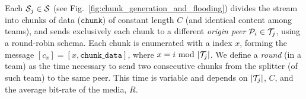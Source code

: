 \begin{figure*}
  \caption{Chunk generation and
    flooding.\label{fig:chunk_generation_and_flooding}}
\end{figure*}
Each ${\cal S}_j\in{\cal S}$ (see
Fig.~\ref{fig:chunk_generation_and_flooding}) divides the stream into
chunks of data ($\mathtt{chunk}$) of constant length $C$ (and
identical content among teams), and sends exclusively each chunk to a
different \emph{origin peer} ${\cal P}_i\in{\cal T}_j$, using a
round-robin schema. Each chunk is enumerated with a index $x$, forming
the message $[c_x]=[x,\mathtt{chunk\_data}]$, where
$x=i~\mathrm{mod}~|{\cal T}_j|$. We define a \emph{round} (in a team)
as the time necessary to send two consecutive chunks from the splitter
(of such team) to the same peer. This time is variable and depends on
$|{\cal T}_j|$, $C$, and the average bit-rate of the media, $R$.

\begin{comment}
The round-time is defined by:
\begin{equation}
  \cal{r} = \cal{c}N.
  \label{eq:round_time}
\end{equation}
For example, if we use only one team of $N=256$ peers, a chunk size
$C=1024$~bytes, and a video of $1$~Mb/s, the round time is
\begin{displaymath}
  \cal{r} = \frac{1024\frac{\text{bytes}}{\text{chunk}}\times
    8\frac{\text{bits}}{\text{byte}}}{10^6\frac{\text{bits}}{\text{second}}}\times
  256 \approx 2.1~\text{seconds}.
\end{displaymath}
\end{comment}
